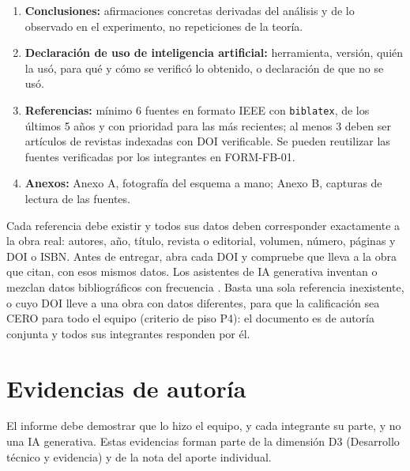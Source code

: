 \documentclass[11pt,a4paper]{article}
\begin{document}
\begin{enumerate}[label=\textbf{\arabic*.},leftmargin=1.8em]
	\item \textbf{Conclusiones:} afirmaciones concretas derivadas del análisis y de lo observado en el experimento, no repeticiones de la teoría.
	\item \textbf{Declaración de uso de inteligencia artificial:} herramienta, versión, quién la usó, para qué y cómo se verificó lo obtenido, o declaración de que no se usó.
	\item \textbf{Referencias:} mínimo 6 fuentes en formato IEEE con \texttt{biblatex}, de los últimos 5 años y con prioridad para las más recientes; al menos 3 deben ser artículos de revistas indexadas con DOI verificable. Se pueden reutilizar las fuentes verificadas por los integrantes en FORM-FB-01.
	\item \textbf{Anexos:} Anexo A, fotografía del esquema a mano; Anexo B, capturas de lectura de las fuentes.
\end{enumerate}

\begin{avisoBox}[title={Referencias: verifique cada una antes de entregar}]
	Cada referencia debe existir y todos sus datos deben corresponder exactamente a la obra real: autores, año, título, revista o editorial, volumen, número, páginas y DOI o ISBN. Antes de entregar, abra cada DOI y compruebe que lleva a la obra que citan, con esos mismos datos. Los asistentes de IA generativa inventan o mezclan datos bibliográficos con frecuencia \cite{walters2023fabrication}. Basta una sola referencia inexistente, o cuyo DOI lleve a una obra con datos diferentes, para que la calificación sea CERO para todo el equipo (criterio de piso P4): el documento es de autoría conjunta y todos sus integrantes responden por él.
\end{avisoBox}

\section{Evidencias de autoría}\label{sec:evidencias}

El informe debe demostrar que lo hizo el equipo, y cada integrante su parte, y no una IA generativa. Estas evidencias forman parte de la dimensión D3 (Desarrollo técnico y evidencia) y de la nota del aporte individual.
\end{document}
